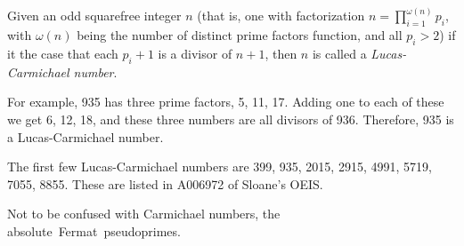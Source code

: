 \documentclass[12pt]{article}
\begin{document}
Given an odd squarefree integer $n$ (that is, one with factorization $\displaystyle n = \prod_{i = 1}^{\omega(n)} p_i$, with $\omega(n)$ being the number of distinct prime factors function, and all $p_i > 2$) if it the case that each $p_i + 1$ is a divisor of $n + 1$, then $n$ is called a {\em Lucas-Carmichael number}.

For example, 935 has three prime factors, 5, 11, 17. Adding one to each of these we get 6, 12, 18, and these three numbers are all divisors of 936. Therefore, 935 is a Lucas-Carmichael number.

The first few Lucas-Carmichael numbers are 399, 935, 2015, 2915, 4991, 5719, 7055, 8855. These are listed in A006972 of Sloane's OEIS.

Not to be confused with Carmichael numbers, the absolute~Fermat~pseudoprimes.
\end{document}
